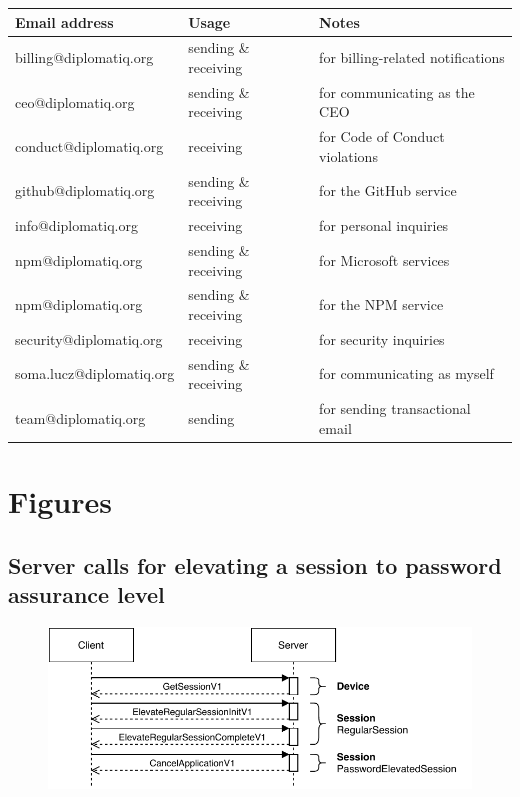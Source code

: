 \begin{table}[!htb]
    \footnotesize
    \begin{tabular}{l|l|l}
        \toprule
        \textbf{Email address}      & \textbf{Usage}            & \textbf{Notes} \\
        \midrule
        billing@diplomatiq.org     & sending \& receiving      & for billing-related notifications \\
        ceo@diplomatiq.org         & sending \& receiving      & for communicating as the CEO \\
        conduct@diplomatiq.org     & receiving                 & for Code of Conduct violations \\
        github@diplomatiq.org      & sending \& receiving      & for the GitHub service \\
        info@diplomatiq.org        & receiving                 & for personal inquiries \\
        npm@diplomatiq.org         & sending \& receiving      & for Microsoft services \\
        npm@diplomatiq.org         & sending \& receiving      & for the NPM service \\
        security@diplomatiq.org    & receiving                 & for security inquiries \\
        soma.lucz@diplomatiq.org   & sending \& receiving      & for communicating as myself \\
        team@diplomatiq.org        & sending                   & for sending transactional email \\
        \bottomrule
    \end{tabular}
\end{table}

\newpage

\section{Figures}

\subsection{Server calls for elevating a session to password assurance level}

\begin{figure}[!htb]
    \includegraphics[width=\textwidth]{figures/elevate-to-password-session.pdf}
\end{figure}

